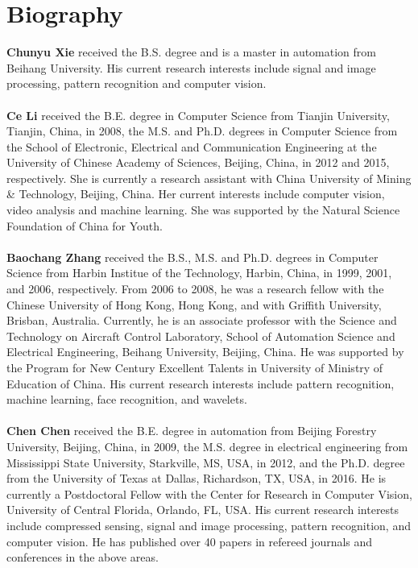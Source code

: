 \documentclass[review]{elsarticle}
\begin{document}
\section*{Biography}
\textbf{Chunyu Xie}
	received the B.S. degree and is a master in automation from Beihang University. His current research interests include signal and image processing, pattern recognition and computer vision.\\ \\
\textbf{Ce Li}
	received the B.E. degree in Computer Science from Tianjin University, Tianjin, China, in 2008, the M.S. and Ph.D. degrees in Computer Science from the School of Electronic, Electrical and Communication Engineering at the University of Chinese Academy of Sciences, Beijing, China, in 2012 and 2015, respectively. She is currently a research assistant with China University of Mining \& Technology, Beijing, China. Her current interests include computer vision, video analysis and machine learning. She was supported by the Natural Science Foundation of China for Youth.\\ \\
\textbf{Baochang Zhang}
	received the B.S., M.S. and Ph.D. degrees in Computer Science from Harbin Institue of the Technology, Harbin, China, in 1999, 2001, and 2006, respectively. From 2006 to 2008, he was a research fellow with the Chinese University of Hong Kong, Hong Kong, and with Griffith University, Brisban, Australia. Currently, he is an associate professor with the Science and Technology on Aircraft Control Laboratory, School of Automation Science and Electrical Engineering, Beihang University, Beijing, China. He was supported by the Program for New Century Excellent Talents in University of Ministry of Education of China. His current research interests include pattern recognition, machine learning, face recognition, and wavelets.\\ \\
\textbf{Chen Chen}
	received the B.E. degree in automation from Beijing Forestry University, Beijing, China, in 2009, the M.S. degree in electrical engineering from Mississippi State University, Starkville, MS, USA, in 2012, and the Ph.D. degree from the University of Texas at Dallas, Richardson, TX, USA, in 2016. He is currently a Postdoctoral Fellow with the Center for Research in Computer Vision, University of Central Florida, Orlando, FL, USA. His current research interests include compressed sensing, signal and image processing, pattern recognition, and computer vision. He has published over 40 papers in refereed journals and conferences in the above areas.\\ \\
\end{document}
